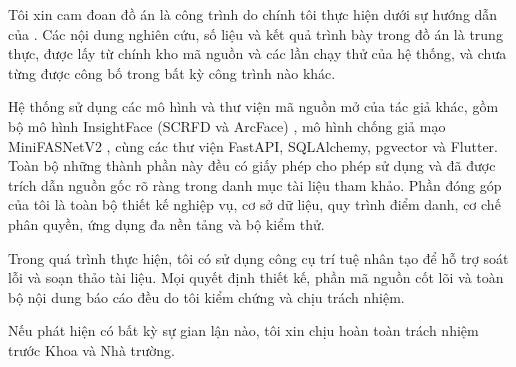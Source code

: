 \begin{declaration}

Tôi xin cam đoan đồ án \emph{\dauTenDeTai} là công trình do chính tôi thực
hiện dưới sự hướng dẫn của \dauGVHD. Các nội dung nghiên cứu, số liệu và kết
quả trình bày trong đồ án là trung thực, được lấy từ chính kho mã nguồn và
các lần chạy thử của hệ thống, và chưa từng được công bố trong bất kỳ công
trình nào khác.

Hệ thống sử dụng các mô hình và thư viện mã nguồn mở của tác giả khác, gồm
bộ mô hình InsightFace  (SCRFD và ArcFace)
\cite{Guo2021SCRFD, Deng2019ArcFace}, mô hình chống giả mạo MiniFASNetV2
\cite{Minivision2020Silent}, cùng các thư viện FastAPI, SQLAlchemy, pgvector
và Flutter. Toàn bộ những thành phần này đều có giấy phép cho phép sử dụng
và đã được trích dẫn nguồn gốc rõ ràng trong danh mục tài liệu tham khảo.
Phần đóng góp của tôi là toàn bộ thiết kế nghiệp vụ, cơ sở dữ liệu, quy
trình điểm danh, cơ chế phân quyền, ứng dụng đa nền tảng và bộ kiểm thử.

Trong quá trình thực hiện, tôi có sử dụng công cụ trí tuệ nhân tạo để hỗ trợ
soát lỗi và soạn thảo tài liệu. Mọi quyết định thiết kế, phần mã nguồn cốt
lõi và toàn bộ nội dung báo cáo đều do tôi kiểm chứng và chịu trách nhiệm.

Nếu phát hiện có bất kỳ sự gian lận nào, tôi xin chịu hoàn toàn trách nhiệm
trước Khoa và Nhà trường.

\vspace{1.4em}
\hfill{}

\end{declaration}
